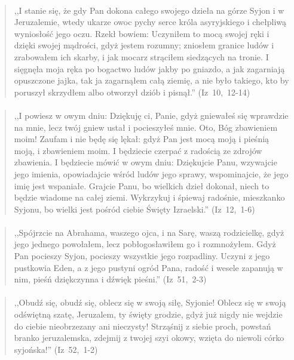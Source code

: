 \documentclass[10pt,a4paper,oneside]{article}
\begin{document}
\paragraph{}
\begin{quote}
,,I stanie się, że gdy Pan dokona całego swojego dzieła na górze Syjon i w Jeruzalemie, wtedy ukarze owoc pychy serce króla asyryjskiego i chełpliwą wyniosłość jego oczu. Rzekł bowiem: Uczyniłem to mocą swojej ręki i dzięki swojej mądrości, gdyż jestem rozumny; zniosłem granice ludów i zrabowałem ich skarby, i jak mocarz strąciłem siedzących na tronie. I sięgnęła moja ręka po bogactwo ludów jakby po gniazdo, a jak zagarniają opuszczone jajka, tak ja zagarnąłem całą ziemię, a nie było takiego, kto by poruszył skrzydłem albo otworzył dziób i pisnął.'' \mbox{(Iz 10, 12-14)}
\end{quote}
\paragraph{}
\begin{quote}
,,I powiesz w owym dniu: Dziękuję ci, Panie, gdyż gniewałeś się wprawdzie na mnie, lecz twój gniew ustał i pocieszyłeś mnie. Oto, Bóg zbawieniem moim! Zaufam i nie będę się lękał: gdyż Pan jest mocą moją i pieśnią moją, i zbawieniem moim. I będziecie czerpać z radością ze zdrojów zbawienia. I będziecie mówić w owym dniu: Dziękujcie Panu, wzywajcie jego imienia, opowiadajcie wśród ludów jego sprawy, wspominajcie, że jego imię jest wspaniałe. Grajcie Panu, bo wielkich dzieł dokonał, niech to będzie wiadome na całej ziemi. Wykrzykuj i śpiewaj radośnie, mieszkanko Syjonu, bo wielki jest pośród ciebie Święty Izraelski.'' \mbox{(Iz 12, 1-6)}
\end{quote}
\paragraph{}
\begin{quote}
,,Spójrzcie na Abrahama, waszego ojca, i na Sarę, waszą rodzicielkę, gdyż jego jednego powołałem, lecz pobłogosławiłem go i rozmnożyłem. Gdyż Pan pocieszy Syjon, pocieszy wszystkie jego rozpadliny. Uczyni z jego pustkowia Eden, a z jego pustyni ogród Pana, radość i wesele zapanują w nim, pieśń dziękczynna i dźwięk pieśni.'' \mbox{(Iz 51, 2-3)}
\end{quote}
\paragraph{}
\begin{quote}
,,Obudź się, obudź się, oblecz się w swoją siłę, Syjonie! Oblecz się w swoją odświętną szatę, Jeruzalem, ty święty grodzie, gdyż już nigdy nie wejdzie do ciebie nieobrzezany ani nieczysty! Strząśnij z siebie proch, powstań branko jeruzalemska, zdejmij z twojej szyi okowy, wzięta do niewoli córko syjońska!'' \mbox{(Iz 52, 1-2)}
\end{quote}
\end{document}
